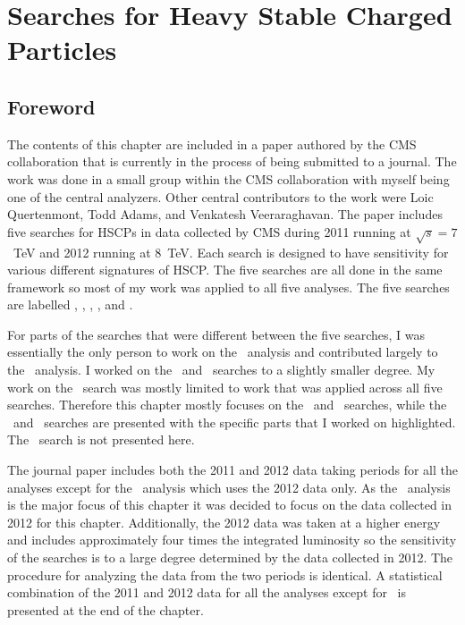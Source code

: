 \chapter{Searches for Heavy Stable Charged Particles \label{sec:search}}

\section{Foreword}
The contents of this chapter are included in a paper authored by the CMS collaboration that is currently in the process of being submitted to a journal. 
The work was done in a small group within the CMS collaboration with myself being one of the central analyzers.
Other central contributors to the work were Loic Quertenmont, Todd Adams, and Venkatesh Veeraraghavan.
The paper includes five searches for HSCPs in data collected by CMS during 2011 running at $\sqrt{s}=7$~TeV and 2012 running at 8~TeV.
Each search is designed to have sensitivity for various different signatures of HSCP. 
The five searches are all done in the same framework
so most of my work was applied to all five analyses. The five searches are labelled \muononly, \tktof, \tkonly, \multi, and \fract. 

For parts of the searches that were different between the five searches,
I was essentially the only person to work on the \muononly\ analysis and contributed largely to the \tktof\ analysis.
I worked on the \tkonly\ and \multi\ searches to a slightly smaller degree. My work on the \fract\ search was mostly limited to work that was applied across all five searches. 
Therefore this chapter mostly focuses on the \muononly\ and \tktof\ searches, while the \tkonly\ and \multi\ searches are presented
with the specific parts that I worked on highlighted. The \fract\ search is not presented here.

The journal paper includes both the 2011 and 2012 data taking periods for all the analyses except for the \muononly\ analysis which uses the 2012 data only. 
As the \muononly\ analysis is the major focus of this chapter it was decided to focus on the data collected in 2012 for this chapter.
Additionally, the 2012 data was taken at a higher energy and includes approximately four times the integrated luminosity so the sensitivity of the searches
is to a large degree determined by the data collected in 2012.
The procedure for analyzing the data from the two periods is identical.
A statistical combination of the 2011 and 2012 data for all the analyses except for \muononly\ is presented at the end of the chapter. 

